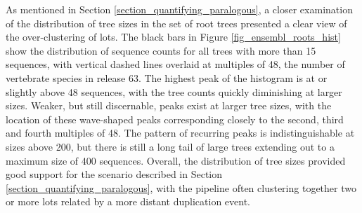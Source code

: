 As mentioned in Section \ref{section_quantifying_paralogous}, a closer
examination of the distribution of tree sizes in the set of root \cmp
trees presented a clear view of the over-clustering of \mammln
\acp{lot}. The black bars in Figure \ref{fig_ensembl_roots_hist} show the
distribution of sequence counts for all trees with more than 15
sequences, with vertical dashed lines overlaid at multiples of 48, the
number of vertebrate species in \ens release 63. The highest peak of
the histogram is at or slightly above 48 sequences, with the tree
counts quickly diminishing at larger sizes. Weaker, but still
discernable, peaks exist at larger tree sizes, with the location of
these wave-shaped peaks corresponding closely to the second, third and
fourth multiples of 48. The pattern of recurring peaks is
indistinguishable at sizes above 200, but there is still a long tail
of large trees extending out to a maximum size of 400
sequences. Overall, the distribution of tree sizes provided good
support for the scenario described in Section
\ref{section_quantifying_paralogous}, with the \cmp pipeline often
clustering together two or more \mammln \acp{lot} related by a more
distant duplication event.

